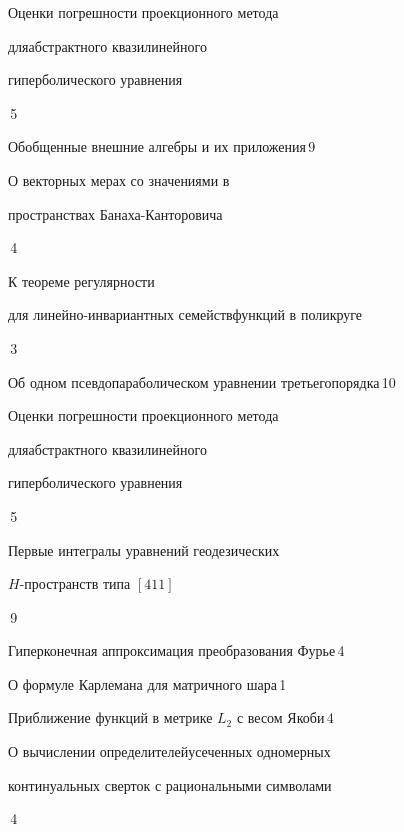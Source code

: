 {Оценки погрешности проекционного метода


для\newline абстрактного квазилинейного


гиперболического уравнения}{\No\,5}




{Обобщенные внешние алгебры и их приложения}{\No\,9}




{О векторных мерах со значениями в  


пространствах Банаха-Канторовича}{\No\,4}




{К теореме регулярности 


для линейно-инвариантных семейств\newline функций в поликруге}{\No\,3}




{Об одном псевдопараболическом уравнении третьего\newline порядка}{\No\,10}




{Оценки погрешности проекционного метода


для\newline абстрактного квазилинейного


гиперболического уравнения}{\No\,5}




{Первые интегралы уравнений геодезических  


$H$-пространств типа $[411]$}{\No\,9}




{Гиперконечная аппроксимация преобразования Фурье}{\No\,4}




{О формуле Карлемана для матричного шара}{\No\,1}




{Приближение функций в метрике $L_2$ с весом Якоби}{\No\,4}




{О вычислении определителей\newline усеченных одномерных 


континуальных сверток с рациональными символами}{\No\,4}





